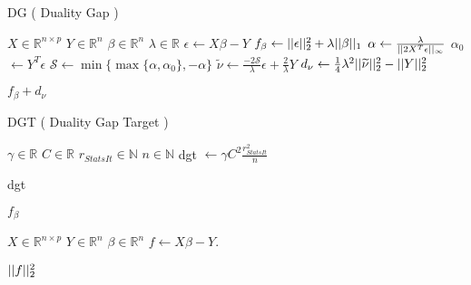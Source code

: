 \documentclass[letterpaper,11pt]{article}
\begin{document}
\FloatBarrier
\begin{algorithm}[!htbp]
  \caption{DG ( Duality Gap ) }
  \begin{algorithmic}[1]
  \Statex
  \Input{}
  \Statex $X \in \mathbb{R}^{n \times p} $ 
  \Statex $Y \in \mathbb{R}^n$  
  \Statex $\beta \in \mathbb{R}^n$  
  \Statex $\lambda \in \mathbb{R}$  
    \State $\epsilon \gets X \beta - Y$
    \State $f_{\beta} \gets \lvert \lvert  \epsilon  \rvert \rvert_2^2 + \lambda \lvert \lvert  \beta  \rvert \rvert_1$
    \State $\alpha \gets \frac{\lambda}{ \lvert \lvert  2 X^T \epsilon  \rvert \rvert_{\infty} }$
    \State $\alpha_0$ $\gets Y^T \epsilon$
    \State $\mathcal{S} \gets \min \{ \max \{ \alpha, \alpha_0 \}, - \alpha \}$
    \State $\widetilde{\nu} \gets \frac{-2 \mathcal{S} }{ \lambda } \epsilon + \frac{2}{\lambda} Y$
    \State $d_{\nu} \gets \frac{1}{4} \lambda^2 \lvert \lvert  \widetilde{\nu}  \rvert \rvert_2^2 - \lvert \lvert  Y  \rvert \rvert_2^2$
  \end{algorithmic}
  \Return $f_{\beta} + d_{\nu}$
\end{algorithm}
\FloatBarrier

\FloatBarrier
\begin{algorithm}[!htbp]
  \caption{DGT ( Duality Gap Target ) }
  \begin{algorithmic}[1]
    \Statex
    \Input{}
    \Statex $\gamma \in \mathbb{R}$ \Comment{ \dots }
    \Statex $C \in \mathbb{R}$  \Comment{ \dots }
    \Statex $r_{Stats It} \in \mathbb{N}$  
    \Statex $n \in \mathbb{N}$  
    \State dgt $\gets \gamma C^2 \frac{ r_{Stats It}^2 }{ n }$
  \end{algorithmic}
  \Return dgt
\end{algorithm}
\FloatBarrier

\FloatBarrier
\begin{algorithm}[!htbp]
  \caption{$f_{\beta}$ }
  \begin{algorithmic}[1]
  \Statex
  \Input{}
  \Statex $X \in \mathbb{R}^{n \times p} $ 
  \Statex $Y \in \mathbb{R}^n$  
  \Statex $\beta \in \mathbb{R}^n$  
    \State $f \gets X \beta - Y$.
  \end{algorithmic}
  \Return $\lvert \lvert  f  \rvert \rvert_2^2$
\end{algorithm}
\FloatBarrier
\end{document}
